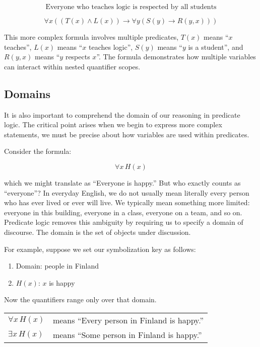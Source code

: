 \documentclass[12pt,a4paper,openany]{article}
\begin{document}
\[\text{Everyone who teaches logic is respected by all students}\]

\[\forall x ((T(x) \land L(x)) \rightarrow \forall y (S(y) \rightarrow R(y,x)))\]

This more complex formula involves multiple predicates, \(T(x)\) means
``\(x\) teaches'', \(L(x)\) means ``\(x\) teaches logic'', \(S(y)\)
means ``\(y\) is a student'', and \(R(y,x)\) means ``\(y\) respects
\(x\)''. The formula demonstrates how multiple variables can interact
within nested quantifier scopes.

\subsection{Domains}\label{domains}

It is also important to comprehend the domain of our reasoning in
predicate logic. The critical point arises when we begin to express more
complex statements, we must be precise about how variables are used
within predicates.

Consider the formula:

\[\forall x \, H(x)\]

which we might translate as ``Everyone is happy.'' But who exactly
counts as ``everyone''? In everyday English, we do not usually mean
literally every person who has ever lived or ever will live. We
typically mean something more limited: everyone in this building,
everyone in a class, everyone on a team, and so on. Predicate logic
removes this ambiguity by requiring us to specify a domain of discourse.
The domain is the set of objects under discussion.

For example, suppose we set our symbolization key as follows:

\begin{enumerate}
    \item Domain: people in Finland
    \item $H(x)$: $x$ is happy
\end{enumerate}

Now the quantifiers range only over that domain.

\begin{center}
\begin{tabular}{ll}
$\forall x \, H(x)$ & means ``Every person in Finland is happy.'' \\
$\exists x \, H(x)$ & means ``Some person in Finland is happy.''
\end{tabular}
\end{center}
\end{document}
